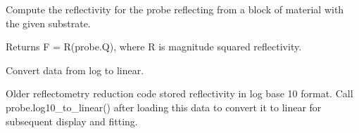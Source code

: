 \documentclass[letterpaper,10pt,english]{sphinxmanual}
\begin{document}
\begin{fulllineitems}
\begin{fulllineitems}
\end{fulllineitems}


\begin{fulllineitems}
\label{api/probe:refl1d.probe.XrayProbe.data}
\end{fulllineitems}


\begin{fulllineitems}
\label{api/probe:refl1d.probe.XrayProbe.fresnel}
Compute the reflectivity for the probe reflecting from a block of
material with the given substrate.

Returns F = R(probe.Q), where R is magnitude squared reflectivity.

\end{fulllineitems}


\begin{fulllineitems}
\label{api/probe:refl1d.probe.XrayProbe.label}
\end{fulllineitems}


\begin{fulllineitems}
\label{api/probe:refl1d.probe.XrayProbe.log10_to_linear}
Convert data from log to linear.

Older reflectometry reduction code stored reflectivity in log base 10
format.  Call probe.log10\_to\_linear() after loading this data to
convert it to linear for subsequent display and fitting.

\end{fulllineitems}


\begin{fulllineitems}
\label{api/probe:refl1d.probe.XrayProbe.name}
\end{fulllineitems}



\end{fulllineitems}
\end{document}
